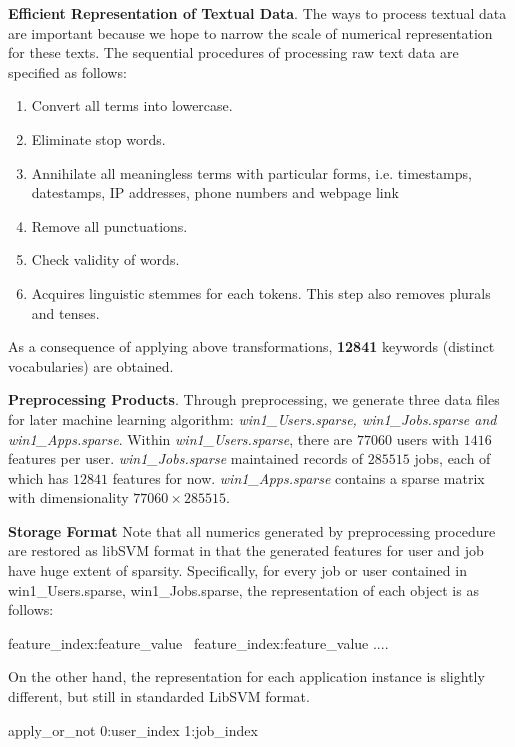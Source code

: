 \documentclass{article} %
\begin{document}
{\bf Efficient Representation of Textual Data}.
The ways to process textual data are important because we hope to narrow the
scale of numerical representation for these texts.  The sequential procedures
of processing raw text data are specified as follows:
\begin{enumerate}[label=(\roman*)]
  \item{Convert all terms into lowercase.}
  \item{Eliminate stop words.}
  \item{Annihilate all meaningless terms with particular forms, i.e.
          timestamps, datestamps, IP addresses, phone numbers and webpage link}
  \item{Remove all punctuations.}
  \item{Check validity of words.}
  \item{Acquires linguistic stemmes for each tokens. This step also removes
          plurals and tenses.}
\end{enumerate}
As a consequence of applying above transformations, {\bf 12841}
keywords (distinct vocabularies) are obtained. 

{\bf Preprocessing Products}.
Through preprocessing, we generate three data files for later machine learning
algorithm: {\it win1\_Users.sparse, win1\_Jobs.sparse and win1\_Apps.sparse}.
Within {\it win1\_Users.sparse}, there are $77060$ users with $1416$ features per
user. {\it win1\_Jobs.sparse} maintained records of $285515$ jobs, each of
which has $12841$ features for now. {\it win1\_Apps.sparse} contains a sparse
matrix with dimensionality $77060\times285515$.

{\bf Storage Format} Note that all numerics generated by preprocessing procedure are restored as libSVM
format in that the generated features for user and job have huge extent of sparsity. 
Specifically, for every job or user contained in win1\_Users.sparse,
win1\_Jobs.sparse, the representation of each object is as follows:
\begin{center}
    feature\_index:feature\_value \ feature\_index:feature\_value .... 
\end{center}
On the other hand, the representation for each application instance is slightly different,
but still in standarded LibSVM format. 
\begin{center}
    apply\_or\_not 0:user\_index 1:job\_index
\end{center}
\end{document}
